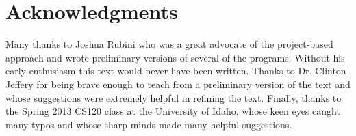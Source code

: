 \chapter*{Acknowledgments}

Many thanks to Joshua Rubini who was a great advocate of the project-based approach and wrote preliminary versions of several of the programs.  Without his early enthusiasm this text would never have been written.  Thanks to Dr. Clinton Jeffery  for being brave enough to teach from a preliminary version of the text and whose suggestions were extremely helpful in refining the text.  Finally, thanks to the Spring 2013 CS120 class at the University of Idaho, whose keen eyes caught many typos and whose sharp minds made many helpful suggestions.
